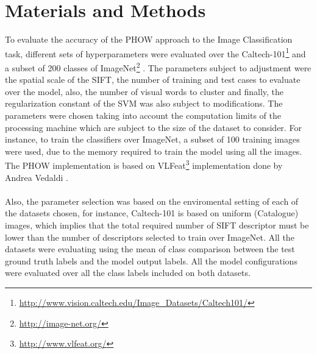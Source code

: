 \documentclass[10pt,twocolumn,letterpaper]{article}
\begin{document}
\section{Materials and Methods}
To evaluate the accuracy of the PHOW approach to the Image Classification task, different sets of hyperparameters were evaluated over the Caltech-101\footnote{\url{http://www.vision.caltech.edu/Image_Datasets/Caltech101/}} \cite{fei2007learning} and a subset of 200 classes of ImageNet\footnote{\url{http://image-net.org/}} \cite{imagenet_cvpr09}. The parameters subject to adjustment were the spatial scale of the SIFT, the number of training and test cases to evaluate over the model, also, the number of visual words to cluster and finally, the regularization constant of the SVM was also subject to modifications. The parameters were chosen taking into account the computation limits of the processing machine which are subject to the size of the dataset to consider. For instance, to train the classifiers over ImageNet, a subset of 100 training images were used, due to the memory required to train the model using all the images. The PHOW implementation is based on VLFeat\footnote{\url{http://www.vlfeat.org/}} implementation done by Andrea Vedaldi \cite{vedaldi08vlfeat}.
\\
\\
Also, the parameter selection was based on the enviromental setting of each of the datasets chosen, for instance, Caltech-101 is based on uniform (Catalogue) images, which implies that the total required number of SIFT descriptor must be lower than the number of descriptors selected to train over ImageNet. All the datasets were evaluating using the mean of class comparison between the test ground truth labels and the model output labels. All the model configurations were evaluated over all the class labels included on both datasets.  
\end{document}
